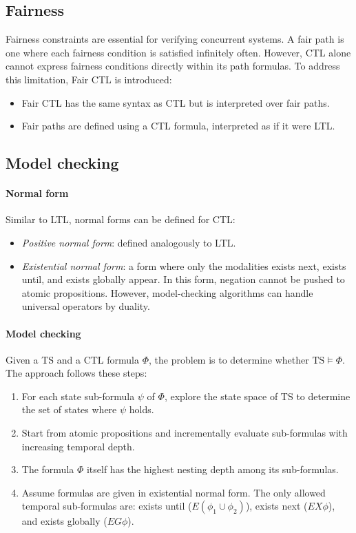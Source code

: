 \subsection{Fairness}
Fairness constraints are essential for verifying concurrent systems. 
A fair path is one where each fairness condition is satisfied infinitely often. 
However, CTL alone cannot express fairness conditions directly within its path formulas.
To address this limitation, Fair CTL is introduced:
\begin{itemize}
    \item Fair CTL has the same syntax as CTL but is interpreted over fair paths.
    \item Fair paths are defined using a CTL formula, interpreted as if it were LTL.
\end{itemize}

\subsection{Model checking}
\paragraph*{Normal form}
Similar to LTL, normal forms can be defined for CTL:
\begin{itemize}
    \item \textit{Positive normal form}: defined analogously to LTL.
    \item \textit{Existential normal form}: a form where only the modalities exists next, exists until, and exists globally appear.
        In this form, negation cannot be pushed to atomic propositions.
        However, model-checking algorithms can handle universal operators by duality. 
\end{itemize}

\paragraph*{Model checking}
Given a TS and a CTL formula $\Phi$, the problem is to determine whether $\text{TS} \models \Phi$. 
The approach follows these steps:
\begin{enumerate}
    \item For each state sub-formula $\psi$ of $\Phi$, explore the state space of $\text{TS}$ to determine the set of states where $\psi$ holds.
    \item Start from atomic propositions and incrementally evaluate sub-formulas with increasing temporal depth.
    \item The formula $\Phi$ itself has the highest nesting depth among its sub-formulas.
    \item Assume formulas are given in existential normal form. 
        The only allowed temporal sub-formulas are: exists until ($E(\phi_1\cup\phi_2)$), exists next ($EX\phi$), and exists globally ($EG\phi$).
\end{enumerate}

